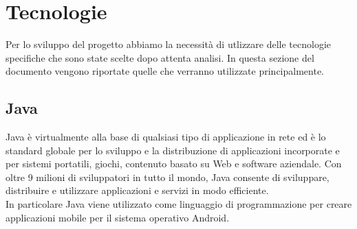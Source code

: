\section{Tecnologie} 
\label{tecnologie}
Per lo sviluppo del progetto abbiamo la necessità di utlizzare delle tecnologie specifiche che sono state scelte dopo attenta analisi. 
In questa sezione del documento vengono riportate quelle che verranno utilizzate principalmente. 

\subsection{Java}
	
	Java è virtualmente alla base di qualsiasi tipo di applicazione in rete ed è lo standard globale per lo sviluppo e la distribuzione di applicazioni incorporate e per sistemi portatili, giochi, contenuto basato su Web e software aziendale. Con oltre 9 milioni di sviluppatori in tutto il mondo, Java consente di sviluppare, distribuire e utilizzare applicazioni e servizi in modo efficiente. \\ 
	In particolare Java viene utilizzato come linguaggio di programmazione per creare applicazioni mobile per il sistema operativo Android.
	
